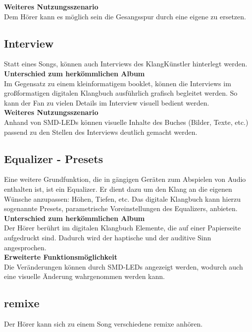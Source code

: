 \textbf{Weiteres Nutzungsszenario}\\
Dem Hörer kann es möglich sein die Gesangsspur durch eine eigene zu ersetzen.





\subsection{Interview}
Statt eines Songs, können auch Interviews des KlangKünstler hinterlegt werden.\\


\textbf{Unterschied zum herkömmlichen Album}\\
Im Gegensatz zu einem kleinformatigem \gls{booklet}, können die Interviews im großformatigen digitalen Klangbuch ausführlich grafisch begleitet werden. So kann der Fan zu vielen Details im Interview visuell bedient werden.\\


\textbf{Weiteres Nutzungsszenario}\\
Anhand von SMD-LEDs können visuelle Inhalte des Buches (Bilder, Texte, etc.) passend zu den Stellen des Interviews deutlich gemacht werden.





\subsection{Equalizer - Presets}
Eine weitere Grundfunktion, die in gängigen Geräten zum Abspielen von Audio enthalten ist, ist ein Equalizer. Er dient dazu um den Klang an die eigenen Wünsche anzupassen: Höhen, Tiefen, etc. Das digitale Klangbuch kann hierzu sogenannte Presets, parametrische Voreinstellungen des Equalizers, anbieten.\\

\textbf{Unterschied zum herkömmlichen Album}\\
Der Hörer berührt im digitalen Klangbuch Elemente, die auf einer Papierseite aufgedruckt sind. Dadurch wird der haptische und der auditive Sinn angesprochen.\\

\textbf{Erweiterte Funktionsmöglichkeit}\\
Die Veränderungen können durch SMD-LEDs angezeigt werden, wodurch auch eine visuelle Änderung wahrgenommen werden kann.



\subsection{\gls{remix}e}
Der Hörer kann sich zu einem Song verschiedene \gls{remix}e anhören.\\

